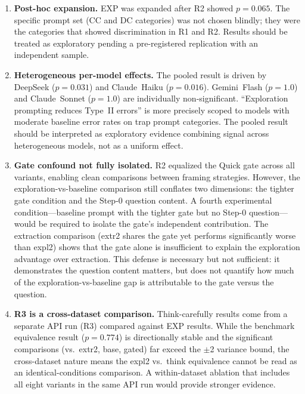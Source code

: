 \documentclass[11pt,a4paper]{article}
\begin{document}
\begin{enumerate}[itemsep=2pt,topsep=4pt]

  \item \textbf{Post-hoc expansion.}  EXP was expanded after R2 showed
    $p = 0.065$.  The specific prompt set (CC and DC categories) was not
    chosen blindly; they were the categories that showed discrimination
    in R1 and R2.  Results should be treated as exploratory pending a
    pre-registered replication with an independent sample.

  \item \textbf{Heterogeneous per-model effects.}  The pooled result is
    driven by DeepSeek ($p = 0.031$) and Claude~Haiku ($p = 0.016$).
    Gemini~Flash ($p = 1.0$) and Claude~Sonnet ($p = 1.0$) are
    individually non-significant.  ``Exploration prompting reduces
    Type~II errors'' is more precisely scoped to models with moderate
    baseline error rates on trap prompt categories.  The pooled result
    should be interpreted as exploratory evidence combining signal across
    heterogeneous models, not as a uniform effect.

  \item \textbf{Gate confound not fully isolated.}  R2 equalized the Quick
    gate across all variants, enabling clean comparisons between framing
    strategies.  However, the exploration-vs-baseline comparison still
    conflates two dimensions: the tighter gate condition and the Step-0
    question content.  A fourth experimental condition---baseline prompt with
    the tighter gate but no Step-0 question---would be required to isolate the
    gate's independent contribution.  The extraction comparison (\textsf{extr2}
    shares the gate yet performs significantly worse than \textsf{expl2})
    shows that the gate alone is insufficient to explain the exploration
    advantage over extraction.  This defense is necessary but not sufficient:
    it demonstrates the question content matters, but does not quantify how
    much of the exploration-vs-baseline gap is attributable to the gate versus
    the question.

  \item \textbf{R3 is a cross-dataset comparison.}  Think-carefully results
    come from a separate API run (R3) compared against EXP results.  While
    the benchmark equivalence result ($p = 0.774$) is directionally stable
    and the significant comparisons (vs.\ extr2, base, gated) far exceed
    the $\pm$2 variance bound, the cross-dataset nature means the
    \textsf{expl2} vs.\ \textsf{think} equivalence cannot be read as an
    identical-conditions comparison.  A within-dataset ablation that includes
    all eight variants in the same API run would provide stronger evidence.


\end{enumerate}
\end{document}
